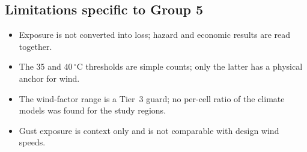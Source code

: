 \subsection{Limitations specific to Group 5}
\begin{itemize}
\item Exposure is not converted into loss; hazard and economic results are read together.
\item The 35 and $40\,^{\circ}\mathrm{C}$ thresholds are simple counts; only the latter has a physical anchor for wind.
\item The wind-factor range is a Tier~3 guard; no per-cell ratio of the climate models was found for the study regions.
\item Gust exposure is context only and is not comparable with design wind speeds.
\end{itemize}
